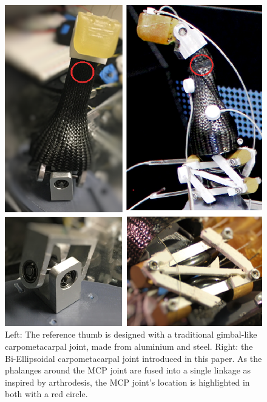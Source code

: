 \documentclass[journal]{IEEEtran}
\begin{document}
\begin{figure}
	\centering
	\includegraphics[width = 1\columnwidth]{figures/four_panel-two_models.eps}
	\caption{Left: The reference thumb is designed with a traditional gimbal-like carpometacarpal joint, made from aluminium and steel. Right: the Bi-Ellipsoidal carpometacarpal joint introduced in this paper. As the phalanges around the MCP joint are fused into a single linkage as inspired by arthrodesis, the MCP joint's location is highlighted in both with a red circle.}
 \label{thumbphoto}
\end{figure}


\end{document}
